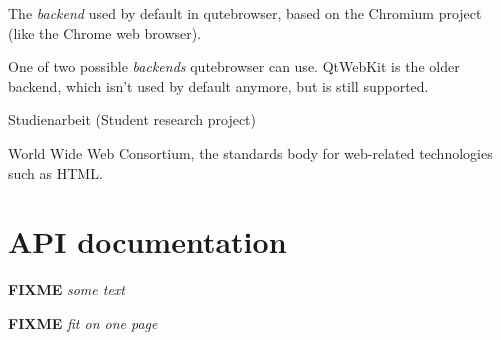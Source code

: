 \documentclass[a4paper,parskip=full]{scrreprt}
\newcommand{\fixme}[1]{\textbf{FIXME} \emph{#1}}
\begin{document}
\begin{appendices}
\begin{multicols}{2}
\begin{description}[leftmargin=0pt]
  \item[QtWebEngine]{The \emph{backend} used by default in qutebrowser, based on
      the Chromium project (like the Chrome web browser).}
  \item[QtWebKit]{One of two possible \emph{backends} qutebrowser can use.
      QtWebKit is the older backend, which isn't used by default anymore, but is
      still supported.}
  \item[SA]{Studienarbeit (Student research project)}
  \item[W3C]{World Wide Web Consortium, the standards body for web-related
      technologies such as HTML.}
\end{description}
\end{multicols}

\chapter{API documentation}
\label{ch:sphinx}
\fixme{some text}


\renewcommand{\bibname}{\chapter{Literature and Sources}}
\printbibliography
\fixme{fit on one page}
\end{appendices}
\end{document}
